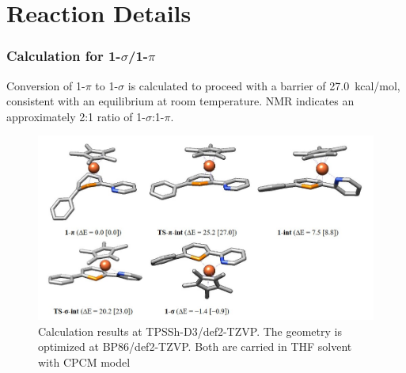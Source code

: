 \documentclass[10pt,aspectratio=43]{beamer}
\numberwithin{equation}{section}
\begin{document}
\section{Reaction Details}

\begin{frame}
\frametitle{Calculation for 1-$ \sigma $/1-$ \pi $}
Conversion of 1-$ \pi $ to 1-$ \sigma $ is calculated to proceed with a barrier of \SI{27.0}{kcal/mol}, consistent with an equilibrium at room temperature. NMR indicates an approximately 2:1 ratio of 1-$ \sigma $:1-$ \pi $.
\begin{figure}
	\includegraphics[width=0.8\linewidth]{conver.jpg}
	\caption{Calculation results at TPSSh-D3/def2-TZVP. The geometry is optimized at BP86/def2-TZVP. Both are carried in THF solvent with CPCM model}
\end{figure}
\end{frame}
\end{document}

